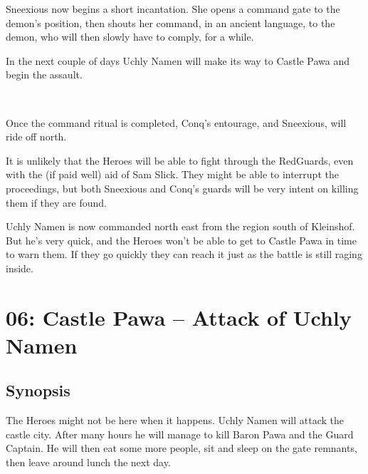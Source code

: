 \documentclass[11pt, twoside, titlepage, a4paper]{report}
\renewcommand{\chaptermark}[1]{\markboth{#1}{}}
\begin{document}
Sneexious now begins a short incantation. She opens a command gate to the demon's position, then shouts her command, in an ancient language, to the demon, who will then slowly have to comply, for a while.

In the next couple of days Uchly Namen will make its way to Castle Pawa and begin the assault.

\

Once the command ritual is completed, Conq's entourage, and Sneexious, will ride off north.

It is unlikely that the Heroes will be able to fight through the RedGuards, even with the (if paid well) aid of Sam Slick. They might be able to interrupt the proceedings, but both Sneexious and Conq's guards will be very intent on killing them if they are found.

Uchly Namen is now commanded north east from the region south of Kleinshof. But he's very quick, and the Heroes won't be able to get to Castle Pawa in time to warn them. If they go quickly they can reach it just as the battle is still raging inside.






















\clearpage
{}
\section*{06: Castle Pawa -- Attack of Uchly Namen}
\chaptermark{castle pawa}


\subsection*{Synopsis}
The Heroes might not be here when it happens. Uchly Namen will attack the castle city. After many hours he will manage to kill Baron Pawa and the Guard Captain. He will then eat some more people, sit and sleep on the gate remnants, then leave around lunch the next day.
\end{document}
